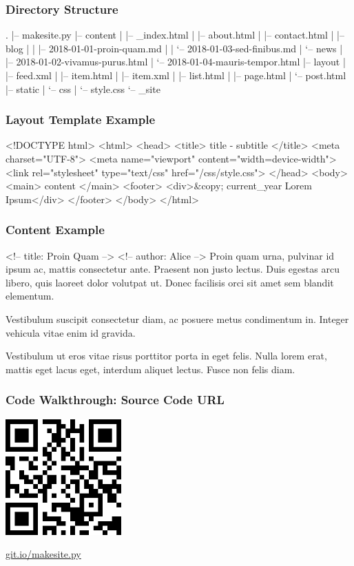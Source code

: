 \documentclass{beamer}
\begin{document}
\begin{frame}[fragile]
\frametitle{Directory Structure}
\begin{plaincode}
.
|-- makesite.py
|-- content
|   |-- _index.html
|   |-- about.html
|   |-- contact.html
|   |-- blog
|   |   |-- 2018-01-01-proin-quam.md
|   |   `-- 2018-01-03-sed-finibus.md
|   `-- news
|       |-- 2018-01-02-vivamus-purus.html
|       `-- 2018-01-04-mauris-tempor.html
|-- layout
|   |-- feed.xml
|   |-- item.html
|   |-- item.xml
|   |-- list.html
|   |-- page.html
|   `-- post.html
|-- static
|   `-- css
|       `-- style.css
`-- _site
\end{plaincode}
\end{frame}


\begin{frame}[fragile]
\frametitle{Layout Template Example}
\begin{htmlcode}
<!DOCTYPE html>
<html>
  <head>
    <title>{{ title }} - {{ subtitle }}</title>
    <meta charset="UTF-8">
    <meta name="viewport" content="width=device-width">
    <link rel="stylesheet" type="text/css" href="/css/style.css">
  </head>
  <body>
    <main>
      {{ content }}
    </main>
    <footer>
      <div>&copy; {{ current_year }} Lorem Ipsum</div>
    </footer>
  </body>
</html>
\end{htmlcode}
\end{frame}


\begin{frame}[fragile]
\frametitle{Content Example}
\begin{contentcode}
<!-- title: Proin Quam -->
<!-- author: Alice -->
Proin quam urna, pulvinar id ipsum ac, mattis consectetur ante. Praesent
non justo lectus. Duis egestas arcu libero, quis laoreet dolor volutpat
ut. Donec facilisis orci sit amet sem blandit elementum.

Vestibulum suscipit consectetur diam, ac posuere metus condimentum in.
Integer vehicula vitae enim id gravida.

Vestibulum ut eros vitae risus porttitor porta in eget felis. Nulla
lorem erat, mattis eget lacus eget, interdum aliquet lectus. Fusce non
felis diam.
\end{contentcode}
\end{frame}


\begin{frame}
\frametitle{Code Walkthrough: Source Code URL}
\centering

\href{https://git.io/makesite.py}{%
    \includegraphics[width=1.75in]{makesite-py-qr.png}%
}

\medskip

\Huge \href{https://git.io/makesite.py}{git.io/makesite.py}
\end{frame}
\end{document}
